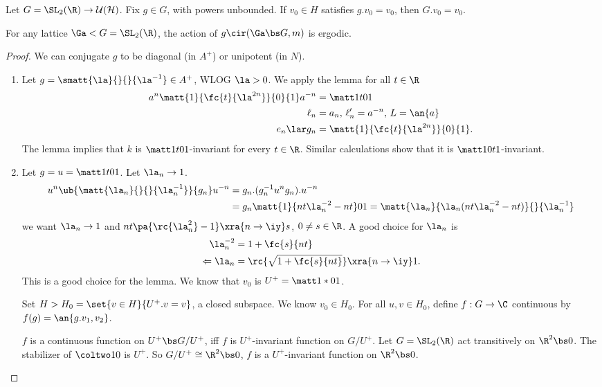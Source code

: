 \begin{thm}
Let $G=\SL_2(\R)\to \cal U(H)$. Fix $g\in G$, with powers unbounded. If $v_0\in H$ satisfies $g.v_0=v_0$, then $G.v_0=v_0$.
\end{thm}
\begin{cor}
For any lattice $\Ga< G=\SL_2(\R)$, the action of $g\cir (\Ga\bs G, m)$ is ergodic.
\end{cor}
\begin{proof}
We can conjugate $g$ to be diagonal (in $A^+$) or unipotent (in $N$). 
\begin{enumerate}
\item
Let $g=\smatt{\la}{}{}{\la^{-1}}\in A^+$, WLOG $\la>0$.  We apply the lemma for all $t\in \R$
\begin{align}
a^n\matt{1}{\fc{t}{\la^{2n}}}{0}{1} a^{-n}
&= \matt 1t01\\
\ell_n&=a_n,\,\ell_n'=a^{-n},\, L=\an{a}\\
e_n\lar g_n &=\matt{1}{\fc{t}{\la^{2n}}}{0}{1}.
\end{align}
The lemma implies that $k$ is $\matt 1t01$-invariant for every $t\in \R$. Similar calculations show that it is $\matt 10t1$-invariant.
\item
Let $g=u=\matt 1t01$. Let $\la_n\to 1$. 
\begin{align}
u^n \ub{\matt{\la_n}{}{}{\la_n^{-1}}}{g_n} u^{-n}
&=g_n.(g_n^{-1}u^n g_n) . u^{-n}\\
&= g_n \matt{1}{nt\la_n^{-2}-nt}01 = \matt{\la_n}{\la_n(nt\la_n^{-2} - nt)}{}{\la_n^{-1}}
\end{align}
we want $\la_n\to 1$ and $nt\pa{\rc{\la_n^2}-1}\xra{n\to \iy} s$, $0\ne s\in \R$. 
A good choice for $\la_n$ is
\begin{align}
\la_n^{-2} &= 1+\fc{s}{nt}\\
\Leftarrow \la_n&= \rc{\sqrt{1+\fc{s}{nt}}}\xra{n\to \iy} 1. 
\end{align}
This is a good choice for the lemma. We know that $v_0$ is $U^+=\matt 1*01$. 

Set $H>H_0=\set{v\in H}{U^+.v=v}$, a closed subspace. We know $v_0\in H_0$. For all $u,v\in H_0$, define $f:G\to \C$ continuous by $f(g)=\an{g.v_1,v_2}$. 

$f$ is a continuous function on $U^+\bs G/U^+$, iff $f$ is $U^+$-invariant function on $G/U^+$. Let $G=\SL_2(\R)$ act transitively on $\R^2\bs 0$. The stabilizer of $\coltwo 10$ is $U^+$.
So $G/U^+\cong \R^2\bs 0$, $f$ is a $U^+$-invariant function on $\R^2\bs 0$. 


\end{enumerate}
\end{proof}

